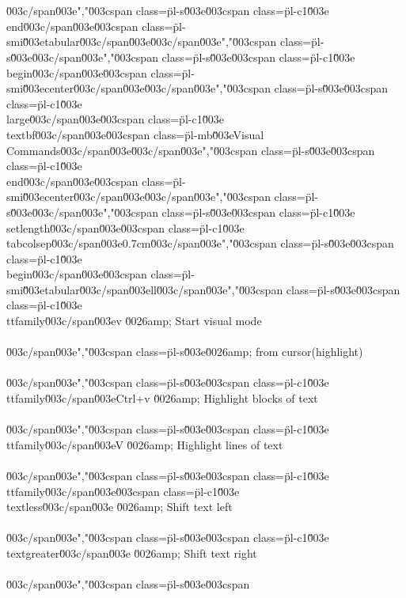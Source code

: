 \\\\\u003c/span\u003e","\u003cspan class=\"pl-s\"\u003e\u003cspan class=\"pl-c1\"\u003e\\end\u003c/span\u003e{\u003cspan class=\"pl-smi\"\u003etabular\u003c/span\u003e}\u003c/span\u003e","\u003cspan class=\"pl-s\"\u003e\u003c/span\u003e","\u003cspan class=\"pl-s\"\u003e\u003cspan class=\"pl-c1\"\u003e\\begin\u003c/span\u003e{\u003cspan class=\"pl-smi\"\u003ecenter\u003c/span\u003e}\u003c/span\u003e","\u003cspan class=\"pl-s\"\u003e\u003cspan class=\"pl-c1\"\u003e\\large\u003c/span\u003e\u003cspan class=\"pl-c1\"\u003e\\textbf\u003c/span\u003e{\u003cspan class=\"pl-mb\"\u003eVisual Commands\u003c/span\u003e}\u003c/span\u003e","\u003cspan class=\"pl-s\"\u003e\u003cspan class=\"pl-c1\"\u003e\\end\u003c/span\u003e{\u003cspan class=\"pl-smi\"\u003ecenter\u003c/span\u003e}\u003c/span\u003e","\u003cspan class=\"pl-s\"\u003e\u003c/span\u003e","\u003cspan class=\"pl-s\"\u003e\u003cspan class=\"pl-c1\"\u003e\\setlength\u003c/span\u003e{\u003cspan class=\"pl-c1\"\u003e\\tabcolsep\u003c/span\u003e}{0.7cm}\u003c/span\u003e","\u003cspan class=\"pl-s\"\u003e\u003cspan class=\"pl-c1\"\u003e\\begin\u003c/span\u003e{\u003cspan class=\"pl-smi\"\u003etabular\u003c/span\u003e}{ll}\u003c/span\u003e","\u003cspan class=\"pl-s\"\u003e\u003cspan class=\"pl-c1\"\u003e\\ttfamily\u003c/span\u003e{v} \u0026amp; Start visual mode\\\\\u003c/span\u003e","\u003cspan class=\"pl-s\"\u003e\u0026amp; from cursor(highlight)\\\\ \u003c/span\u003e","\u003cspan class=\"pl-s\"\u003e\u003cspan class=\"pl-c1\"\u003e\\ttfamily\u003c/span\u003e{Ctrl+v} \u0026amp; Highlight blocks of text\\\\\u003c/span\u003e","\u003cspan class=\"pl-s\"\u003e\u003cspan class=\"pl-c1\"\u003e\\ttfamily\u003c/span\u003e{V} \u0026amp; Highlight lines of text\\\\\u003c/span\u003e","\u003cspan class=\"pl-s\"\u003e\u003cspan class=\"pl-c1\"\u003e\\ttfamily\u003c/span\u003e{\u003cspan class=\"pl-c1\"\u003e\\textless\u003c/span\u003e} \u0026amp; Shift text left\\\\\u003c/span\u003e","\u003cspan class=\"pl-s\"\u003e\u003cspan class=\"pl-c1\"\u003e\\textgreater\u003c/span\u003e \u0026amp; Shift text right\\\\\u003c/span\u003e","\u003cspan class=\"pl-s\"\u003e\u003cspan 